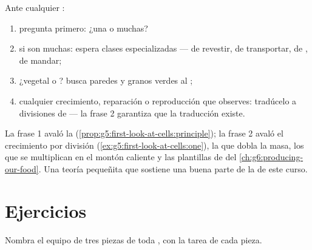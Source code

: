 \begin{method}\label{met:g6:cell-unit-of-life:read}
Ante cualquier :
\begin{enumerate}
  \item pregunta primero: ¿una  o muchas?
  \item si son muchas: espera clases especializadas --- de revestir, de
        transportar, de , de mandar;
  \item ¿vegetal o ? busca paredes y granos verdes al ;
  \item cualquier crecimiento, reparación o reproducción que observes:
        tradúcelo a divisiones de  --- la frase 2 garantiza que
        la traducción existe.
\end{enumerate}
\end{method}

\begin{example}\label{ex:g6:cell-unit-of-life:atwork}
La frase 1 avaló la 
(\cref{prop:g5:first-look-at-cells:principle}); la frase 2 avaló el
crecimiento por división (\cref{ex:g5:first-look-at-cells:one}), la
 que dobla la masa, los  que se multiplican en
el montón caliente y las plantillas de  del
\cref{ch:g6:producing-our-food}. Una teoría pequeñita que sostiene una
buena parte de la  de este curso.
\end{example}

\section{Ejercicios}

\begin{exercise}[$\star$]\label{exo:g6:cell-unit-of-life:1}
Nombra el equipo de tres piezas de toda , con la tarea de cada
pieza.
\end{exercise}

